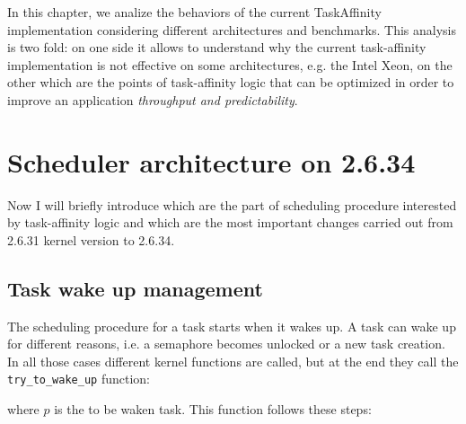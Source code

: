 In this chapter, we analize the behaviors of the current TaskAffinity
implementation considering different architectures and benchmarks.  This
analysis is two fold: on one side it allows to understand why the current
task-affinity implementation is not effective on some architectures, e.g. the
Intel Xeon, on the other which are the points of task-affinity logic that can be
optimized in order to improve an application \emph{throughput and
predictability}.

\section{Scheduler architecture on 2.6.34}

Now I will briefly introduce which are the part of scheduling procedure 
interested by task-affinity logic and which are the most important changes 
carried out from 2.6.31 kernel version to 2.6.34.

\subsection{Task wake up management}

The scheduling procedure for a task starts when it wakes up. A task can wake up
for different reasons, i.e. a semaphore becomes unlocked or a new task creation.  In all those cases different
kernel functions are called, but at the end they call the
\texttt{try\_to\_wake\_up} function:

\lstset{basicstyle=\footnotesize, language=c, captionpos=b, frame=single, label=lis:APIttwu}


where $p$ is the to be waken task.
This function follows these steps:

